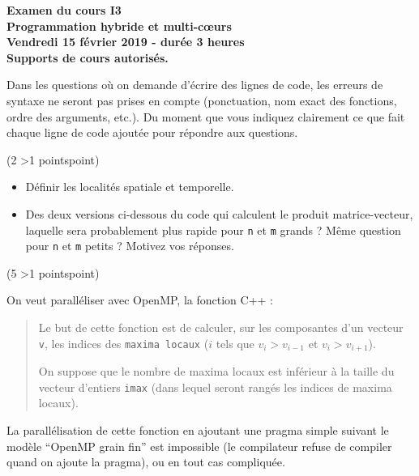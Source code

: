 \documentclass[12pt]{report}
\newcounter{cptPoints}
\newcounter{cptQuestions}
\newcommand\question[2]{\bigskip\par\addtocounter{cptQuestions}{1}\addtocounter{cptPoints}{#2}{\bf Question #1 n\textsuperscript{o} \thecptQuestions} (#2 \ifnum#2>1 points\else point\fi)\par}
\begin{document}
	\begin{center}\Large\bf
			Examen du cours I3\\
			Programmation hybride et multi-c\oe urs\\[0.4cm]
			Vendredi 15 f\'evrier 2019 - dur\'ee 3 heures\\
			Supports de cours autoris\'es.
		\end{center}
	\bigskip
	Dans les questions o\`u on demande d'\'ecrire des lignes de code, les erreurs de syntaxe ne seront pas prises en compte (ponctuation, nom exact des fonctions, ordre des arguments, etc.). Du moment que vous indiquez clairement ce que fait chaque ligne de code ajout\'ee pour r\'epondre aux questions.
		
	\bigskip
	
	\question{}2
	
	\begin{itemize}
		\item D\'efinir les localit\'es spatiale et temporelle.
		
		\item Des deux versions ci-dessous du code qui calculent le produit matrice-vecteur, laquelle sera probablement plus rapide pour {\tt n} et {\tt m} grands ? M\^eme question pour {\tt n} et {\tt m} petits ?  Motivez vos r\'eponses.
		
		
		
		
	\end{itemize}

	
	\question{}5
	\medskip
	
	   On veut parall\'eliser avec OpenMP, la fonction C++ :
	
	
	\begin{quotation}\noindent%
		Le but de cette fonction est de calculer, sur les composantes d'un vecteur {\tt v}, les indices des {\tt maxima locaux} ($i$ tels que $v_i > v_{i-1}$ et $v_i > v_{i+1}$).
		
		\noindent%
		On suppose que le nombre de maxima locaux est inf\'erieur \`a la taille du vecteur d'entiers {\tt imax} (dans lequel seront rang\'es les indices de maxima locaux).
	\end{quotation}
	 
 La parall\'elisation de cette fonction en ajoutant une pragma simple suivant le mod\`ele ``OpenMP grain fin'' est impossible (le compilateur refuse de compiler quand on ajoute la pragma), ou en tout cas compliqu\'ee.
 
\end{document}
